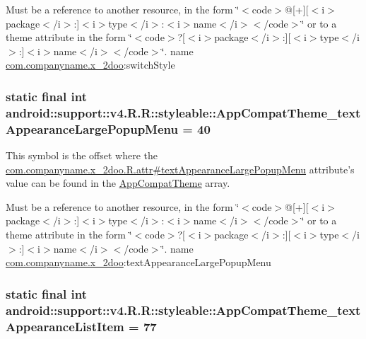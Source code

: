 Must be a reference to another resource, in the form \char`\"{}$<$code$>$@\mbox{[}+\mbox{]}\mbox{[}$<$i$>$package$<$/i$>$:\mbox{]}$<$i$>$type$<$/i$>$:$<$i$>$name$<$/i$>$$<$/code$>$\char`\"{} or to a theme attribute in the form \char`\"{}$<$code$>$?\mbox{[}$<$i$>$package$<$/i$>$:\mbox{]}\mbox{[}$<$i$>$type$<$/i$>$:\mbox{]}$<$i$>$name$<$/i$>$$<$/code$>$\char`\"{}.  name \hyperlink{namespacecom_1_1companyname_1_1x__2doo}{com.companyname.x\_\-2doo}:switchStyle \hypertarget{classandroid_1_1support_1_1v4_1_1_r_1_1styleable_96bd7ab78a1b2db3505d8f14a3ca0737}{
\subsubsection[{AppCompatTheme\_\-textAppearanceLargePopupMenu}]{\setlength{\rightskip}{0pt plus 5cm}static final int android::support::v4.R.R::styleable::AppCompatTheme\_\-textAppearanceLargePopupMenu = 40}}
\label{classandroid_1_1support_1_1v4_1_1_r_1_1styleable_96bd7ab78a1b2db3505d8f14a3ca0737}


This symbol is the offset where the \hyperlink{classcom_1_1companyname_1_1x__2doo_1_1_r_1_1attr_eb9c1b382bfb6774cca7ca009e4b8b12}{com.companyname.x\_\-2doo.R.attr\#textAppearanceLargePopupMenu} attribute's value can be found in the \hyperlink{classandroid_1_1support_1_1v4_1_1_r_1_1styleable_0873e92ba21076bb5a4aeadeb7f5779f}{AppCompatTheme} array.

Must be a reference to another resource, in the form \char`\"{}$<$code$>$@\mbox{[}+\mbox{]}\mbox{[}$<$i$>$package$<$/i$>$:\mbox{]}$<$i$>$type$<$/i$>$:$<$i$>$name$<$/i$>$$<$/code$>$\char`\"{} or to a theme attribute in the form \char`\"{}$<$code$>$?\mbox{[}$<$i$>$package$<$/i$>$:\mbox{]}\mbox{[}$<$i$>$type$<$/i$>$:\mbox{]}$<$i$>$name$<$/i$>$$<$/code$>$\char`\"{}.  name \hyperlink{namespacecom_1_1companyname_1_1x__2doo}{com.companyname.x\_\-2doo}:textAppearanceLargePopupMenu \hypertarget{classandroid_1_1support_1_1v4_1_1_r_1_1styleable_942cd40a2b7ea9d627e07dc8a7b02152}{
\subsubsection[{AppCompatTheme\_\-textAppearanceListItem}]{\setlength{\rightskip}{0pt plus 5cm}static final int android::support::v4.R.R::styleable::AppCompatTheme\_\-textAppearanceListItem = 77}}
\label{classandroid_1_1support_1_1v4_1_1_r_1_1styleable_942cd40a2b7ea9d627e07dc8a7b02152}


